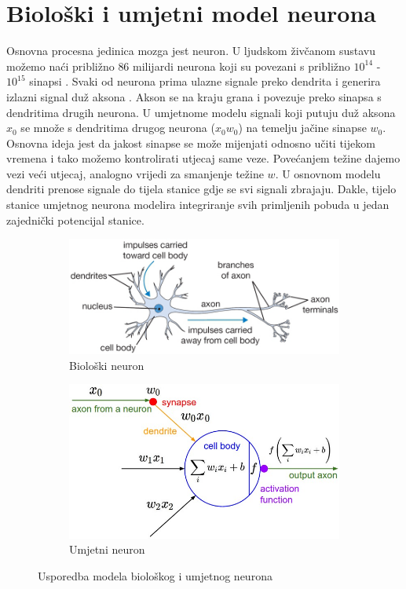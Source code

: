 \documentclass[times, utf8, diplomski]{fer}
\theoremstyle{definition}
\begin{document}
\section{Biološki i umjetni model neurona}
Osnovna procesna jedinica mozga jest neuron. U ljudskom živčanom sustavu možemo naći približno $86$ milijardi neurona koji su povezani s približno $10^{14}$ - $10^{15}$ sinapsi . Svaki od neurona prima ulazne signale preko dendrita  i generira izlazni signal duž aksona . Akson se na kraju grana i povezuje preko sinapsa s dendritima drugih neurona. U umjetnome modelu signali koji putuju duž aksona $x_0$ se množe s dendritima drugog neurona ($x_0w_0$) na temelju jačine sinapse $w_0$. Osnovna ideja jest da jakost sinapse se može mijenjati odnosno učiti tijekom vremena i tako možemo kontrolirati utjecaj same veze. Povećanjem težine dajemo vezi veći utjecaj, analogno vrijedi za smanjenje težine $w$. U osnovnom modelu dendriti prenose signale do tijela stanice gdje se svi signali zbrajaju. Dakle, tijelo stanice umjetnog neurona modelira integriranje svih primljenih pobuda u jedan zajednički potencijal stanice.
\begin{figure}[h]
\centering
\begin{subfigure}{.5\textwidth}
\centering
\includegraphics[width=\linewidth]{neuron.png}
\caption{Biološki neuron}
\label{fig:sub1}
\end{subfigure}%
\begin{subfigure}{.5\textwidth}
\centering
\includegraphics[width=\linewidth]{neuron_model.jpeg}
\caption{Umjetni neuron}
\label{fig:sub2}
\end{subfigure}
\caption{Usporedba modela biološkog i umjetnog neurona}
\label{fig:test}
\end{figure}
\end{document}

